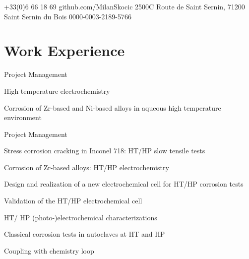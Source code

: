 \documentclass[11pt, a4paper, notitlepage]{article}
\begin{document}
\selectfont
\pagestyle{empty}
		
	
	
	{+33(0)6 66 18 69}
	{github.com/MilanSkocic}
	{2500C Route de Saint Sernin, 71200 Saint Sernin du Bois}
	{0000-0003-2189-5766}
	
	
	\section*{Work Experience}
		\begin{jobdetails}
			\item Project Management
			\item High temperature electrochemistry
			\item Corrosion of Zr-based and Ni-based alloys in aqueous high temperature environment
		\end{jobdetails}
		
		\begin{jobdetails}
			\item Project Management
			\item Stress corrosion cracking in Inconel 718: HT/HP slow tensile tests
			\item Corrosion of Zr-based alloys: HT/HP electrochemistry
		\end{jobdetails}

		\begin{jobdetails}
			\item Design and realization of a new electrochemical cell for HT/HP corrosion tests
			\item Validation of the HT/HP electrochemical cell
			\item HT/ HP (photo-)electrochemical characterizations
			\item Classical corrosion tests in autoclaves at HT and HP
			\item Coupling with chemistry loop
		\end{jobdetails}
\end{document}
